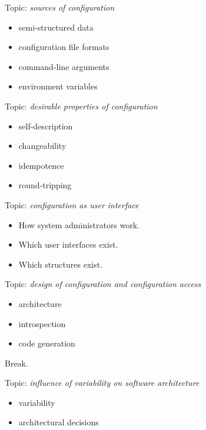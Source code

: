 \documentclass{beamer}
\begin{document}
\begin{frame}
	Topic: \textit{sources of configuration}
	\begin{itemize}
		\item semi-structured data
		\item configuration file formats
		\item command-line arguments
		\item environment variables
	\end{itemize}
\end{frame}

\begin{frame}
	Topic: \textit{desirable properties of configuration}
	\begin{itemize}
		\item self-description
		\item changeability
		\item idempotence
		\item round-tripping
	\end{itemize}
\end{frame}

\begin{frame}
	Topic: \textit{configuration as user interface}
	\begin{itemize}
		\item How system administrators work.
		\item Which user interfaces exist.
		\item Which structures exist.
	\end{itemize}
\end{frame}

\begin{frame}
	Topic: \textit{design of configuration and configuration access}
	\begin{itemize}
		\item architecture
		\item introspection
		\item code generation
	\end{itemize}
\end{frame}

\begin{assignment}
	\begin{task}
	Break.
	\end{task}
\end{assignment}

\begin{frame}
	Topic: \textit{influence of variability on software architecture}
	\begin{itemize}
		\item variability
		\item architectural decisions
	\end{itemize}
\end{frame}
\end{document}
